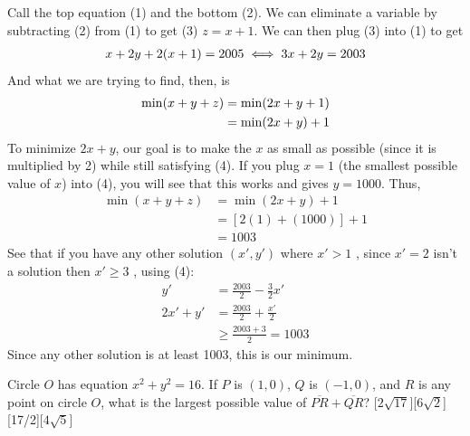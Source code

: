 \documentclass[12pt]{article}
\newcounter{problem}
\begin{document}
\begin{solution}[E]
   Call the top equation (1) and the bottom (2). We can eliminate a variable by subtracting (2) from (1) to get (3) $z = x+1$. We can then plug (3) into (1) to get
   \begin{align}\setcounter{equation}{3}
       x+2y+2(x+1)=2005 \iff 3x+2y = 2003
   \end{align}
   And what we are trying to find, then, is
   \begin{align*}
       \min(x+y+z) &= \min(2x+y+1)\notag\\
       &= \min(2x+y)+1
   \end{align*}
   To minimize $2x+y$, our goal is to make the $x$ as small as possible (since it is multiplied by 2) while still satisfying (4). If you plug $x=1$ (the smallest possible value of $x$) into (4), you will see that this works and gives $y=1000$. Thus,
   \begin{align*}
       \min(x+y+z) &= \min(2x+y)+1\\
       &=[2(1)+(1000)]+1 \\
       &=\boxed{1003}
   \end{align*}
   See that if you have any other solution $(x',y')$ where $x'>1$ , since $x'=2$ isn't a solution then $x' \geq 3$ , using (4):
   \begin{align*}
       y' &= \frac{2003}{2} - \frac{3}{2}x' \\
       2x'+ y' &= \frac{2003}{2} + \frac{x'}{2} \\
       &\geq \frac{2003+3}{2} = 1003
   \end{align*}
   Since any other solution is at least 1003, this is our minimum.
\end{solution}

\begin{problem}
   Circle $O$ has equation $x^2 + y^2 = 16$. If $P$ is $(1,0)$, $Q$ is $(-1,0)$, and $R$ is any point on circle $O$, what is the largest possible value of $\overline{PR} + \overline{QR}$?
   [$2\sqrt{17}$][$6\sqrt{2}$][17/2][$4\sqrt{5}$]
\end{problem}
\end{document}
